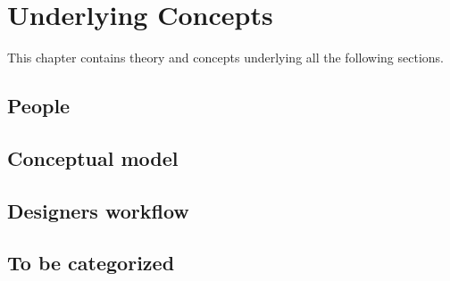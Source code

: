 \chapter{Underlying Concepts} \label{chap:concepts}
This chapter contains theory and concepts underlying all the following sections.

\section{People}


\section{Conceptual model} \label{sec:conceptual_model}




\section{Designers workflow}


\section{To be categorized}

